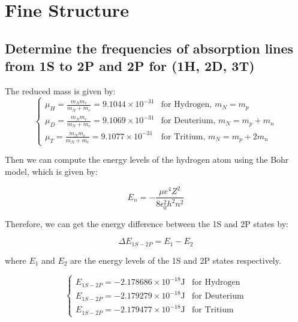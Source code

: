 \documentclass[11pt]{article}
\begin{document}
    \newpage
    \section{Fine Structure}

    \subsection{Determine the frequencies of absorption lines from 1S to 2P and 2P for (1H, 2D, 3T)}

    The reduced mass is given by:
    \begin{equation}
        \begin{cases}
            \mu_H = \frac{m_N m_e}{m_N + m_e} = 9.1044 \times 10^{-31} & \text{for Hydrogen, $m_N = m_p$} \\
            \mu_D = \frac{m_N m_e}{m_N + m_e} = 9.1069 \times 10^{-31} & \text{for Deuterium, $m_N = m_p + m_n$} \\
            \mu_T = \frac{m_N m_e}{m_N + m_e} = 9.1077 \times 10^{-31} & \text{for Tritium, $m_N = m_p + 2m_n$}
        \end{cases}
    \end{equation}

    Then we can compute the energy levels of the hydrogen atom using the Bohr model, which is given by:

    \begin{equation}
        E_n = - \frac{\mu e^4 Z^2}{8 \epsilon_0^2 h^2 n^2} 
    \end{equation}

    Therefore, we can get the energy difference between the 1S and 2P states by:

    \begin{equation}
        \Delta E_{1S-2P} = E_1 - E_2
    \end{equation}
    
    where $E_1$ and $E_2$ are the energy levels of the 1S and 2P states respectively. 

    \begin{equation}
        \begin{cases}
            E_{1S-2P} = -2.178686 \times 10^{-18} \text{J} & \text{for Hydrogen} \\
            E_{1S-2P} = -2.179279 \times 10^{-18} \text{J} & \text{for Deuterium} \\
            E_{1S-2P} = -2.179477 \times 10^{-18} \text{J} & \text{for Tritium}
        \end{cases}
    \end{equation}
\end{document}
